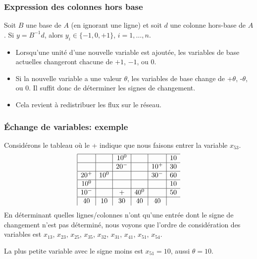 \documentclass[usepdftitle=false]{beamer}
\begin{document}
\begin{frame}
\frametitle{Expression des colonnes hors base}

\begin{mltheorem}
Soit $B$ une base de $A$ (en ignorant une ligne) et soit $d$ une colonne hors-base de $A$.
Si $y = B^{-1}d$, alors $y_i \in \{ -1, 0, +1 \}$, $i = 1,\ldots,n$.
\end{mltheorem}

\begin{itemize}
	\item 
Lorsqu'une unité d'une nouvelle variable est ajoutée, les variables de base actuelles changeront chacune de $+1$, $-1$, ou $0$.
	\item 
Si la nouvelle variable a une valeur $\theta$, les variables de base
change de +$\theta$, -$\theta$, ou 0. Il suffit donc de déterminer les signes de
changement.
	\item 
Cela revient à redistribuer les flux sur le réseau.
\end{itemize}

\end{frame}

\begin{frame}
\frametitle{Échange de variables: exemple}

Considérons le tableau où le + indique que nous faisons entrer la variable $x_{53}$.
$$
	\begin{array}{|c|c|c|c|c|c}
		\hline
		& & 10^0 & & & 10 \\
		\hline
		& & 20^- & & 10^+ & 30 \\
		\hline
		20^+ & 10^0 & & & 30^- & 60 \\
		\hline
		10^0 & & & & & 10 \\
		\hline
        10^- & & + & 40^0 & & 50 \\
		\hline
		40 & 10 & 30 & 40 & 40 & \\
	\end{array}
$$
En déterminant quelles lignes/colonnes n'ont qu'une entrée dont le signe de changement n'est pas déterminé, nous voyons que l'ordre de considération des variables est $x_{13}$, $x_{23}$, $x_{25}$, $x_{35}$, $x_{32}$, $x_{31}$, $x_{41}$, $x_{51}$, $x_{54}$.

La plus petite variable avec le signe moins est $x_{51} = 10$, aussi $\theta = 10$.
\end{frame}
\end{document}
